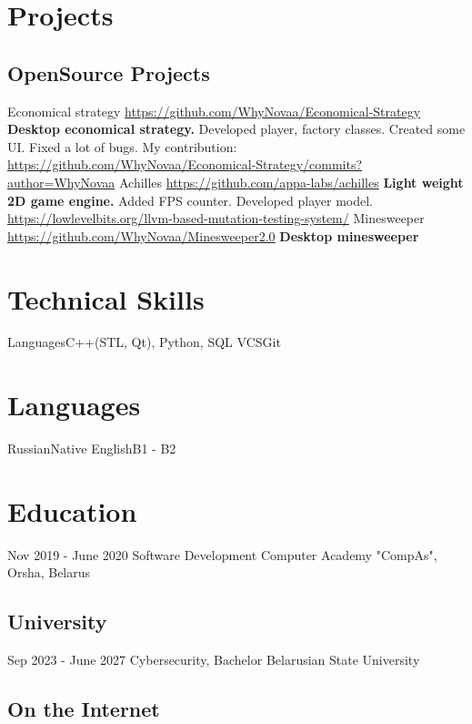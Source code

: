 \documentclass[11pt,a4paper]{moderncv}
\begin{document}
\maketitle

\section{Projects}
  \subsection{OpenSource Projects}
  \cvline
    {Economical strategy}
    {\url{https://github.com/WhyNovaa/Economical-Strategy}\newline{}
    \textbf{Desktop economical strategy.}\newline{}
    Developed player, factory classes.\newline{}
    Created some UI. \newline{}
    Fixed a lot of bugs.\newline{}
    My contribution:\newline{}
    \url{https://github.com/WhyNovaa/Economical-Strategy/commits?author=WhyNovaa}}
  \cvline
    {Achilles}
    {\url{https://github.com/appa-labs/achilles}\newline{}
    \textbf{Light weight 2D game engine.}\newline{}
    Added FPS counter.\newline{}
    Developed player model. \newline{}
    \url{https://lowlevelbits.org/llvm-based-mutation-testing-system/}
    }
  \cvline 
    {Minesweeper}
    {\url{https://github.com/WhyNovaa/Minesweeper2.0}\newline{}
    \textbf{Desktop minesweeper}\newline{}
    }
    
\section{Technical Skills}
\cvline
  {Languages}{C++(STL, Qt), Python, SQL}
\cvline
  {VCS}{Git}
\section {Languages}
\cvline 
  {Russian}{Native}
\cvline 
  {English}{B1 - B2}
\section{Education}
  \cventry
    {Nov 2019 - June 2020}
    {Software Development}
    {Computer Academy "CompAs", Orsha, Belarus}
    {}{}{}
  \subsection{University}
  \cventry
    {Sep 2023 - June 2027}
    {Cybersecurity, Bachelor}
    {Belarusian State University}
    {}{}{}


  \subsection{On the Internet}
\end{document}
